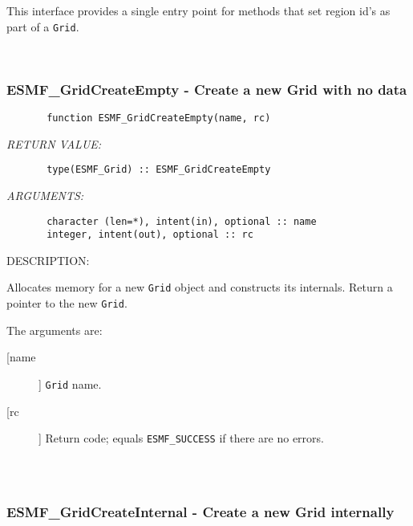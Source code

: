 {       This interface provides a single entry point for methods that set
       region id's as part of a {\tt Grid}.
   
 
\mbox{}\hrulefill\ 
 
\subsubsection{ESMF\_GridCreateEmpty - Create a new Grid with no data}


 
\begin{verbatim}       function ESMF_GridCreateEmpty(name, rc)\end{verbatim}{\em RETURN VALUE:}
\begin{verbatim}       type(ESMF_Grid) :: ESMF_GridCreateEmpty\end{verbatim}{\em ARGUMENTS:}
\begin{verbatim}       character (len=*), intent(in), optional :: name
       integer, intent(out), optional :: rc               \end{verbatim}
{\sf DESCRIPTION:\\ }


       Allocates memory for a new {\tt Grid} object and constructs its
       internals.  Return a pointer to the new {\tt Grid}.
  
       The arguments are:
       \begin{description}
       \item[[name]] 
            {\tt Grid} name.
       \item[[rc]] 
            Return code; equals {\tt ESMF\_SUCCESS} if there are no errors.
     \end{description}
  
\begin{verbatim} \end{verbatim}
 
 
\mbox{}\hrulefill\ 
 
\subsubsection{ESMF\_GridCreateInternal - Create a new Grid internally}


}
